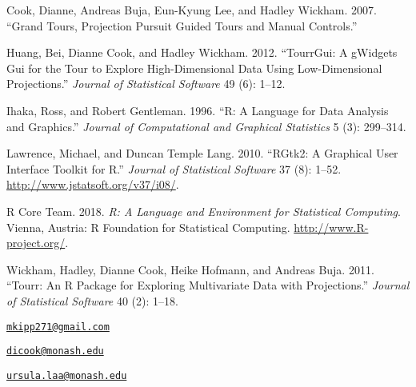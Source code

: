 \hypertarget{ref-gt_pp_mc}{}
Cook, Dianne, Andreas Buja, Eun-Kyung Lee, and Hadley Wickham. 2007.
``Grand Tours, Projection Pursuit Guided Tours and Manual Controls.''

\hypertarget{ref-tourrGui}{}
Huang, Bei, Dianne Cook, and Hadley Wickham. 2012. ``TourrGui: A
gWidgets Gui for the Tour to Explore High-Dimensional Data Using
Low-Dimensional Projections.'' \emph{Journal of Statistical Software} 49
(6): 1--12.

\hypertarget{ref-ihaka:1996}{}
Ihaka, Ross, and Robert Gentleman. 1996. ``R: A Language for Data
Analysis and Graphics.'' \emph{Journal of Computational and Graphical
Statistics} 5 (3): 299--314.

\hypertarget{ref-RGtk2}{}
Lawrence, Michael, and Duncan Temple Lang. 2010. ``RGtk2: A Graphical
User Interface Toolkit for R.'' \emph{Journal of Statistical Software}
37 (8): 1--52. \url{http://www.jstatsoft.org/v37/i08/}.

\hypertarget{ref-R}{}
R Core Team. 2018. \emph{R: A Language and Environment for Statistical
Computing}. Vienna, Austria: R Foundation for Statistical Computing.
\url{http://www.R-project.org/}.

\hypertarget{ref-tourr}{}
Wickham, Hadley, Dianne Cook, Heike Hofmann, and Andreas Buja. 2011.
``Tourr: An R Package for Exploring Multivariate Data with
Projections.'' \emph{Journal of Statistical Software} 40 (2): 1--18.

\address{%
Michael Kipp\\
Monash University\\
Department of Econometrics and Business Statistics\\
}
\href{mailto:mkipp271@gmail.com}{\nolinkurl{mkipp271@gmail.com}}

\address{%
Dianne Cook\\
Monash University\\
Department of Econometrics and Business Statistics\\
}
\href{mailto:dicook@monash.edu}{\nolinkurl{dicook@monash.edu}}

\address{%
Ursula Laa\\
Monash University\\
Department of Physics\\
}
\href{mailto:ursula.laa@monash.edu}{\nolinkurl{ursula.laa@monash.edu}}

